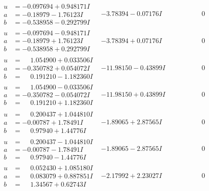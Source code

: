 \documentclass[1p]{elsarticle_modified}
\theoremstyle{definition}
\begin{document}
$$\begin{array}{c|c|c}
\begin{aligned}
u &= -0.097694 + 0.948171 I \\
a &= -0.18979 - 1.76123 I \\
b &= -0.538958 - 0.292799 I\end{aligned}
 & -3.78394 - 0.07176 I & \phantom{-0.000000 } 0 \\ \hline\begin{aligned}
u &= -0.097694 - 0.948171 I \\
a &= -0.18979 + 1.76123 I \\
b &= -0.538958 + 0.292799 I\end{aligned}
 & -3.78394 + 0.07176 I & \phantom{-0.000000 } 0 \\ \hline\begin{aligned}
u &= \phantom{-}1.054900 + 0.033506 I \\
a &= -0.350782 + 0.054072 I \\
b &= \phantom{-}0.191210 - 1.182360 I\end{aligned}
 & -11.98150 - 0.43899 I & \phantom{-0.000000 } 0 \\ \hline\begin{aligned}
u &= \phantom{-}1.054900 - 0.033506 I \\
a &= -0.350782 - 0.054072 I \\
b &= \phantom{-}0.191210 + 1.182360 I\end{aligned}
 & -11.98150 + 0.43899 I & \phantom{-0.000000 } 0 \\ \hline\begin{aligned}
u &= \phantom{-}0.200437 + 1.044810 I \\
a &= -0.00787 + 1.78491 I \\
b &= \phantom{-}0.97940 + 1.44776 I\end{aligned}
 & -1.89065 + 2.87565 I & \phantom{-0.000000 } 0 \\ \hline\begin{aligned}
u &= \phantom{-}0.200437 - 1.044810 I \\
a &= -0.00787 - 1.78491 I \\
b &= \phantom{-}0.97940 - 1.44776 I\end{aligned}
 & -1.89065 - 2.87565 I & \phantom{-0.000000 } 0 \\ \hline\begin{aligned}
u &= \phantom{-}0.052430 + 1.085180 I \\
a &= \phantom{-}0.083079 + 0.887851 I \\
b &= \phantom{-}1.34567 + 0.62743 I\end{aligned}
 & -2.17992 + 2.23027 I & \phantom{-0.000000 } 0 \\ \hline\begin{aligned}

\end{aligned}
\end{array}$$
\end{document}
